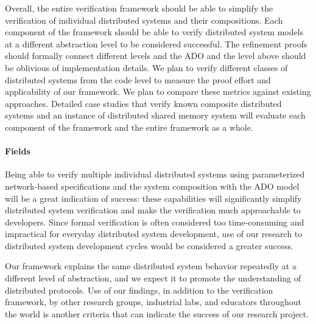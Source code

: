 \documentclass[11pt]{article}
\begin{document}
Overall, the entire verification framework should be able to simplify
the verification of individual distributed systems and their compositions. Each component
of the framework should be able to verify distributed system models at a different abstraction level
to be considered successful. The refinement proofs should formally connect different levels
and the ADO and the level above should be oblivious of implementation details. We plan to verify 
different classes of distributed systems from the code level to measure the proof effort and 
applicability of our framework. We plan to compare these metrics against existing approaches. 
Detailed case studies that verify known composite distributed systems and an instance of distributed 
shared memory system will evaluate each component of the framework and the entire framework as a whole.


\paragraph{Fields} Being able to verify multiple individual distributed systems using parameterized 
network-based specifications and the system composition with the ADO model will be a great 
indication of success: these capabilities will significantly simplify distributed system verification
and make the verification much approachable to developers. 
Since formal verification is often considered too time-consuming and impractical for everyday 
distributed system development, use of our research to distributed system development 
cycles would be considered a greater success.

Our framework explains the same distributed system behavior repeatedly at a different 
level of abstraction, and we expect it to promote the understanding of distributed protocols. 
Use of our findings, in addition to the verification framework, by other research 
groups, industrial labs, and educators throughout the world is another criteria that can 
indicate the success of our research project. 
%
%
%
\end{document}
